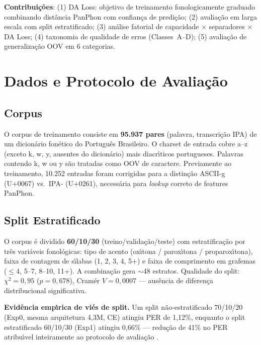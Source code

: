 \documentclass[12pt]{article}
\newcommand{\ipag}{\textipa{g}}%
\begin{document}
\textbf{Contribui\c{c}\~oes}: (1) DA Loss: objetivo de treinamento
fonologicamente graduado combinando dist\^ancia PanPhon com confian\c{c}a
de predi\c{c}\~ao; (2) avalia\c{c}\~ao em larga escala com split
estratificado; (3) an\'alise fatorial de capacidade $\times$ separadores
$\times$ DA Loss; (4) taxonomia de qualidade de erros (Classes~A--D);
(5) avalia\c{c}\~ao de generaliza\c{c}\~ao OOV em 6 categorias.

\section{Dados e Protocolo de Avalia\c{c}\~ao}

\subsection{Corpus}

O corpus de treinamento consiste em \textbf{95.937 pares}
(palavra, transcri\c{c}\~ao IPA) de um dicion\'ario fon\'etico do
Portugu\^es Brasileiro. O charset de entrada cobre a--z (exceto k, w, y,
ausentes do dicion\'ario) mais diacr\'{\i}ticos portugueses. Palavras
contendo k, w ou y s\~ao tratadas como OOV de caractere. Previamente ao
treinamento, 10.252 entradas foram corrigidas para a distin\c{c}\~ao
ASCII-g (U+0067) vs.\ IPA-\ipag{} (U+0261), necess\'aria para
\emph{lookup} correto de features PanPhon.

\subsection{Split Estratificado}

O corpus \'e dividido \textbf{60/10/30} (treino/valida\c{c}\~ao/teste)
com estratifica\c{c}\~ao por tr\^es vari\'aveis fonol\'ogicas: tipo de
acento (ox\'{\i}tona / parox\'{\i}tona / proparox\'{\i}tona), faixa de
contagem de s\'{\i}labas (1, 2, 3, 4, 5+) e faixa de comprimento em
grafemas ($\leq$4, 5--7, 8--10, 11+). A combina\c{c}\~ao gera
${\sim}$48 estratos. Qualidade do split: $\chi^2{=}0{,}95$ ($p{=}0{,}678$),
Cram\'er $V{=}0{,}0007$ --- aus\^encia de diferen\c{c}a distribucional
significativa.

\textbf{Evid\^encia emp\'{\i}rica de vi\'es de split.} Um split
n\~ao-estratificado 70/10/20 (Exp0, mesma arquitetura 4,3M, CE) atingiu
PER de 1,12\%, enquanto o split estratificado 60/10/30 (Exp1) atingiu
0,66\% --- redu\c{c}\~ao de 41\% no PER atribu\'{\i}vel inteiramente ao
protocolo de avalia\c{c}\~ao \cite{kohavi1995crossvalidation}.
\end{document}
